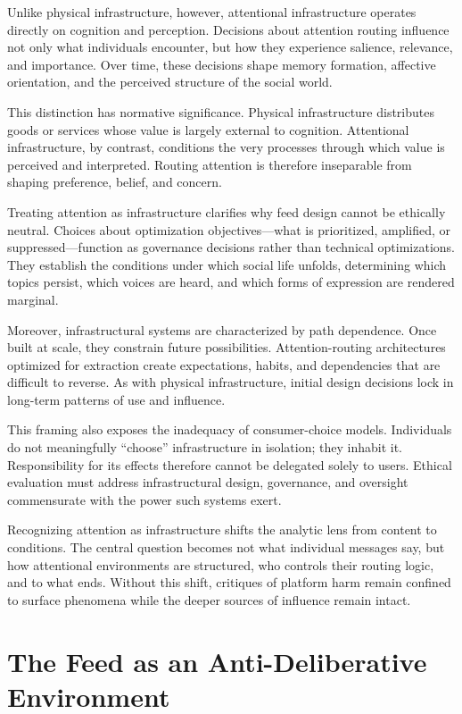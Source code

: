 \documentclass[12pt]{article}
\begin{document}
Unlike physical infrastructure, however, attentional infrastructure operates directly on cognition and perception. Decisions about attention routing influence not only what individuals encounter, but how they experience salience, relevance, and importance. Over time, these decisions shape memory formation, affective orientation, and the perceived structure of the social world.

This distinction has normative significance. Physical infrastructure distributes goods or services whose value is largely external to cognition. Attentional infrastructure, by contrast, conditions the very processes through which value is perceived and interpreted. Routing attention is therefore inseparable from shaping preference, belief, and concern.

Treating attention as infrastructure clarifies why feed design cannot be ethically neutral. Choices about optimization objectives—what is prioritized, amplified, or suppressed—function as governance decisions rather than technical optimizations. They establish the conditions under which social life unfolds, determining which topics persist, which voices are heard, and which forms of expression are rendered marginal.

Moreover, infrastructural systems are characterized by path dependence. Once built at scale, they constrain future possibilities. Attention-routing architectures optimized for extraction create expectations, habits, and dependencies that are difficult to reverse. As with physical infrastructure, initial design decisions lock in long-term patterns of use and influence.

This framing also exposes the inadequacy of consumer-choice models. Individuals do not meaningfully ``choose'' infrastructure in isolation; they inhabit it. Responsibility for its effects therefore cannot be delegated solely to users. Ethical evaluation must address infrastructural design, governance, and oversight commensurate with the power such systems exert.

Recognizing attention as infrastructure shifts the analytic lens from content to conditions. The central question becomes not what individual messages say, but how attentional environments are structured, who controls their routing logic, and to what ends. Without this shift, critiques of platform harm remain confined to surface phenomena while the deeper sources of influence remain intact.

\section{The Feed as an Anti-Deliberative Environment}
\end{document}
